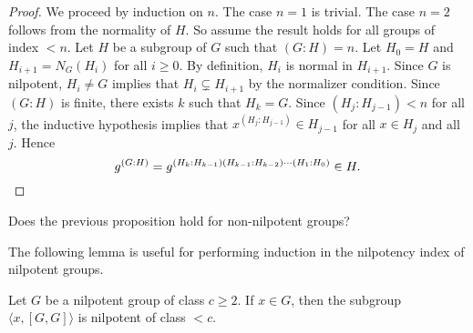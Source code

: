 \begin{proof}
We proceed by induction on $n$. The case $n=1$ is trivial. The case  
$n=2$ follows from the normality of  $H$. So assume the result 
holds for all groups of index $<n$. Let $H$ be a subgroup of $G$ such that $(G:H)=n$. 
Let $H_0=H$ and $H_{i+1}=N_G(H_i)$ for all $i\geq0$. By definition, $H_{i}$ is normal in 
$H_{i+1}$. Since $G$ is nilpotent, $H_i\ne G$
implies that $H_i\subsetneq H_{i+1}$ by the normalizer condition. 
Since $(G:H)$ is finite, there exists $k$ such that  $H_k=G$. Since
$(H_j:H_{j-1})<n$ for all $j$, the inductive hypothesis implies that 
	$x^{(H_j:H_{j-1})}\in H_{j-1}$ for all $x\in H_j$ and all $j$. Hence 
	\[
		g^{(G:H)}=g^{(H_k:H_{k-1})(H_{k-1}:H_{k-2})\cdots (H_1:H_0)}\in H.\qedhere 
	\]
\end{proof}

\begin{exercise}
\label{xca:g^n}
    Does the previous proposition hold for non-nilpotent groups? 
\end{exercise}


The following lemma is useful for performing induction 
in the nilpotency index of nilpotent groups. 

\begin{lemma}
\label{lem:a[GG]}
Let $G$ be a nilpotent group of class $c\geq2$. If $x\in G$, then 
the subgroup 
$\langle x,[G,G]\rangle$ is nilpotent of class $<c$.
\end{lemma}

